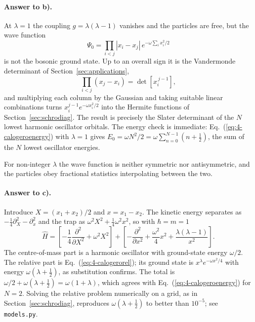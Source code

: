 \paragraph{Answer to b).}
At $\lambda=1$ the coupling $g=\lambda(\lambda-1)$ vanishes and the particles
are free, but the wave function
\begin{equation}
  \Psi_0 = \prod_{i<j}|x_i-x_j|\,e^{-\omega\sum_i x_i^2/2}
  \label{eq:4-exc8}
\end{equation}
is not the bosonic ground state.  Up to an overall sign it is the Vandermonde
determinant of Section~\ref{sec:applications},
\begin{equation}
  \prod_{i<j}(x_j-x_i) = \det\left[x_i^{\,j-1}\right],
  \label{eq:4-exc9}
\end{equation}
and multiplying each column by the Gaussian and taking suitable linear
combinations turns $x_i^{j-1}e^{-\omega x_i^2/2}$ into the Hermite functions
of Section~\ref{sec:schrodiag}.  The result is precisely the Slater
determinant of the $N$ lowest harmonic oscillator orbitals.  The energy check
is immediate: Eq.~(\ref{eq:4-calogeroenergy}) with $\lambda=1$ gives
$E_0=\omega N^2/2 = \omega\sum_{n=0}^{N-1}(n+\tfrac12)$, the sum of the $N$
lowest oscillator energies.

For non-integer $\lambda$ the wave function is neither symmetric nor
antisymmetric, and the particles obey fractional statistics interpolating
between the two.

\paragraph{Answer to c).}
Introduce $X=(x_1+x_2)/2$ and $x=x_1-x_2$.  The kinetic energy separates as
$-\tfrac14\partial_X^2-\partial_x^2$ and the trap as
$\omega^2 X^2 + \tfrac14\omega^2 x^2$, so with $\hbar=m=1$
\begin{equation}
  \hat{H} = \left[-\frac{1}{4}\frac{\partial^2}{\partial X^2}
     + \omega^2 X^2\right]
   + \left[-\frac{\partial^2}{\partial x^2}
     + \frac{\omega^2}{4}x^2
     + \frac{\lambda(\lambda-1)}{x^2}\right].
  \label{eq:4-exc10}
\end{equation}
The centre-of-mass part is a harmonic oscillator with ground-state energy
$\omega/2$.  The relative part is Eq.~(\ref{eq:4-calogerorel}); its ground
state is $x^{\lambda}e^{-\omega x^2/4}$ with energy $\omega(\lambda+\tfrac12)$,
as substitution confirms.  The total is
$\omega/2+\omega(\lambda+\tfrac12)=\omega(1+\lambda)$, which agrees with
Eq.~(\ref{eq:4-calogeroenergy}) for $N=2$.  Solving the relative problem
numerically on a grid, as in Section~\ref{sec:schrodiag}, reproduces
$\omega(\lambda+\tfrac12)$ to better than $10^{-5}$; see \texttt{models.py}.

